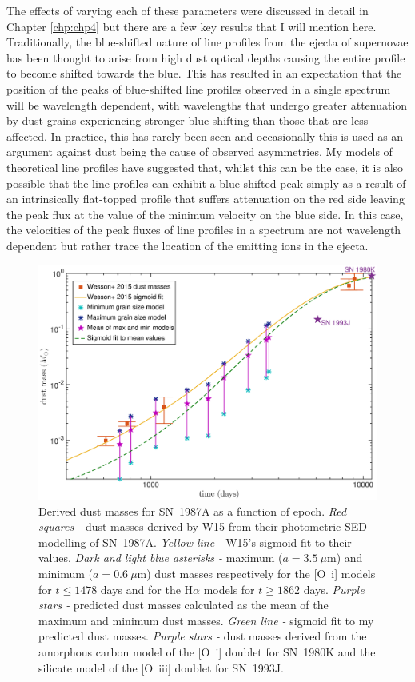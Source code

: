 The effects of varying each of these parameters were discussed in detail in Chapter \ref{chp:chp4} but there are a few key results that I will mention here.  Traditionally, the blue-shifted nature of line profiles from the ejecta of supernovae has been thought to arise from high dust optical depths causing the entire profile to become shifted towards the blue.  This has resulted in an expectation that the position of the peaks of blue-shifted line profiles observed in a single spectrum will be wavelength dependent, with wavelengths that undergo greater attenuation by dust grains experiencing stronger blue-shifting than those that are less affected.  In practice, this has rarely been seen and occasionally this is used as an argument against dust being the cause of observed asymmetries.  My models of theoretical line profiles have suggested that, whilst this can be the case, it is also possible that the line profiles can exhibit a blue-shifted peak simply as a result of an intrinsically flat-topped profile that suffers attenuation on the red side leaving the peak flux at the value of the minimum velocity on the blue side.  In this case, the velocities of the peak fluxes of line profiles in a spectrum are not wavelength dependent but rather trace the location of the emitting ions in the ejecta.

\begin{figure}
\centering
\includegraphics[scale=0.47,clip=true, trim=70 0 80 30]{chapters/chapter7/figs/Mdust_evol8.eps}
\caption{Derived dust masses for SN~1987A as a function of epoch. 
\textit{Red squares -} dust masses derived by W15 
from their photometric SED modelling of SN~1987A. \textit{Yellow line} - 
W15's sigmoid fit to 
their values. \textit{Dark and light blue asterisks -} maximum 
($a=3.5~\mu$m) and 
minimum ($a=0.6~\mu$m) dust masses respectively for the [O~{\sc i}] models 
for $t \le 1478$ days and for the H$\alpha$ models for $t \ge 1862$ days. 
\textit{Purple 
stars -} predicted dust masses calculated as the mean of the maximum and 
minimum dust masses.
\textit{Green line -} sigmoid fit 
to my predicted dust masses.  \textit{Purple stars -} dust masses derived from the amorphous carbon model of the [O~{\sc i}] doublet for SN~1980K and the silicate model of the [O~{\sc iii}] doublet for SN~1993J.}
\label{dust1}
\end{figure}

